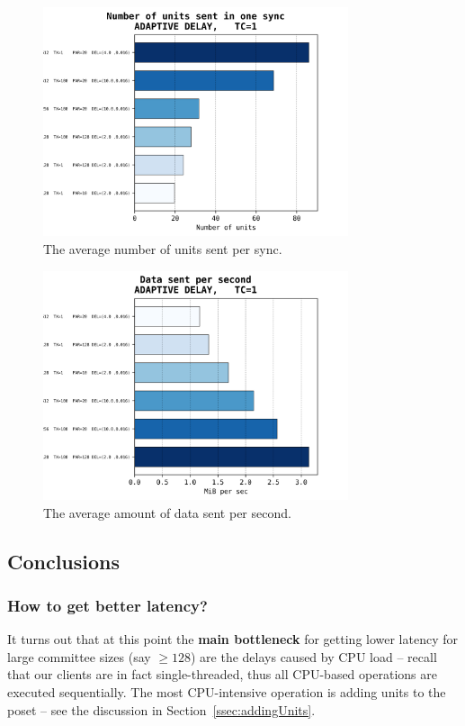 \documentclass[a4paper,10pt]{article}
\begin{document}
			\begin{figure}[h]
				\centering
				\includegraphics[width=0.8\textwidth]{bar_plots/big/units_sent_sync.png}
				\caption{The average number of units sent per sync.}
				\label{fig:bigUnitsPerSync}
			\end{figure}
			\begin{figure}[h]
				\centering
				\includegraphics[width=0.8\textwidth]{bar_plots/big/bytes_sent_per_sec.png}
				\caption{The average amount of data sent per second.}
				\label{fig:bigBps}
			\end{figure}

		\subsection{Conclusions}

			\subsubsection*{How to get better latency?}
				It turns out that at this point the {\bf main bottleneck} for getting lower latency for large committee sizes (say $\geq 128$) are the delays caused by CPU load -- recall that our clients are in fact single-threaded, thus all CPU-based operations are executed sequentially.
				The most CPU-intensive operation is adding units to the poset -- see the discussion in Section~\ref{ssec:addingUnits}.
\end{document}
